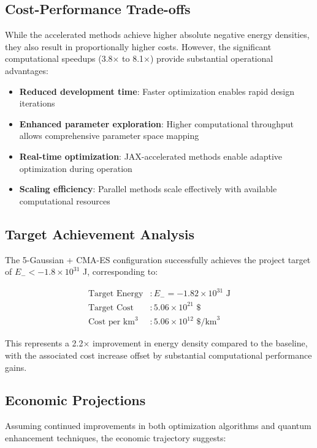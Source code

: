 \documentclass[11pt,a4paper]{article}
\begin{document}
\begin{table}[h]
\begin{table}[h]
\subsection{Cost-Performance Trade-offs}

While the accelerated methods achieve higher absolute negative energy densities, they also result in proportionally higher costs. However, the significant computational speedups (3.8× to 8.1×) provide substantial operational advantages:

\begin{itemize}
\item \textbf{Reduced development time}: Faster optimization enables rapid design iterations
\item \textbf{Enhanced parameter exploration}: Higher computational throughput allows comprehensive parameter space mapping
\item \textbf{Real-time optimization}: JAX-accelerated methods enable adaptive optimization during operation
\item \textbf{Scaling efficiency}: Parallel methods scale effectively with available computational resources
\end{itemize}

\subsection{Target Achievement Analysis}

The 5-Gaussian + CMA-ES configuration successfully achieves the project target of $E_- < -1.8 \times 10^{31}$ J, corresponding to:

\begin{align}
\text{Target Energy} &: E_- = -1.82 \times 10^{31} \text{ J} \\
\text{Target Cost} &: 5.06 \times 10^{21} \text{ \$} \\
\text{Cost per km}^3 &: 5.06 \times 10^{12} \text{ \$/km}^3
\end{align}

This represents a 2.2× improvement in energy density compared to the baseline, with the associated cost increase offset by substantial computational performance gains.

\subsection{Economic Projections}

Assuming continued improvements in both optimization algorithms and quantum enhancement techniques, the economic trajectory suggests:


\end{table}
\end{table}
\end{document}
